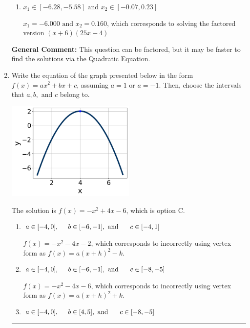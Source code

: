 \documentclass{extbook}[14pt]
\newcommand{\litem}[1]{\item #1

\rule{\textwidth}{0.4pt}}
\begin{document}
\begin{enumerate}
{\begin{enumerate}[label=\Alph*.]
* $x_1 = -1.200 \text{ and } x_2 = 0.800$, which is the correct option. Obtained by solving the factored version $(5x + 6)(5x -4)$
\item \( x_1 \in [-6.28, -5.58] \text{ and } x_2 \in [-0.07, 0.23] \)

$x_1 = -6.000 \text{ and } x_2 = 0.160$, which corresponds to solving the factored version $(x + 6)(25x -4)$
\end{enumerate}

\textbf{General Comment:} This question can be factored, but it may be faster to find the solutions via the Quadratic Equation.
}
\litem{
Write the equation of the graph presented below in the form $f(x)=ax^2+bx+c$, assuming  $a=1$ or $a=-1$. Then, choose the intervals that $a, b,$ and $c$ belong to.

\begin{center}
    \includegraphics[width=0.5\textwidth]{../Figures/quadraticGraphToEquationCopyB.png}
\end{center}


The solution is \( f(x) = -x^{2} +4 x -6 \), which is option C.\begin{enumerate}[label=\Alph*.]
\item \( a \in [-4, 0], \hspace*{5mm} b \in [-6, -1], \text{ and } \hspace*{5mm} c \in [-4, 1] \)

$f(x)=-x^{2} -4 x -2$, which corresponds to incorrectly using vertex form as $f(x) = a(x+h)^2 - k$.
\item \( a \in [-4, 0], \hspace*{5mm} b \in [-6, -1], \text{ and } \hspace*{5mm} c \in [-8, -5] \)

$f(x)=-x^{2} -4 x -6$, which corresponds to incorrectly using vertex form as $f(x) = a(x+h)^2+k$.
\item \( a \in [-4, 0], \hspace*{5mm} b \in [4, 5], \text{ and } \hspace*{5mm} c \in [-8, -5] \)


\end{enumerate}}
\end{enumerate}
\end{document}
